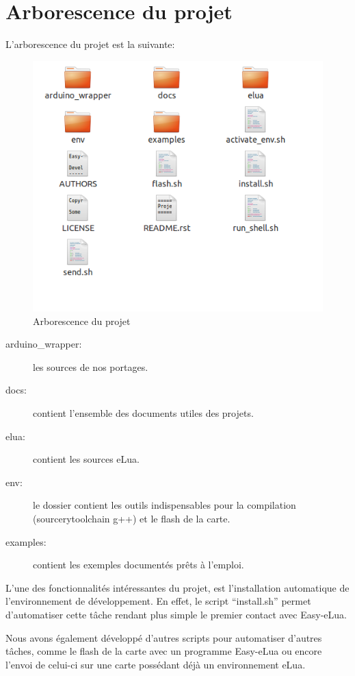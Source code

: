 \chapter[Arborescence du projet]{Arborescence du projet}
\label{chap:chap7}

L'arborescence du projet est la suivante:

\begin{figure}[h]
\begin{center}
\includegraphics[scale=0.6]{figure/arborescence.png}
\caption{Arborescence du projet}
\end{center}
\end{figure}

\begin{description}
 \item[arduino\_wrapper: ] les sources de nos portages.
 \item[docs: ] contient l’ensemble des documents utiles des projets.
 \item[elua: ] contient les sources eLua.
 \item[env: ] le dossier contient les outils indispensables pour la compilation (sourcerytoolchain g++) et le flash de la carte.
 \item[examples: ] contient les exemples documentés prêts à l’emploi.
\end{description}
 
L’une des fonctionnalités intéressantes du projet, est l’installation automatique de l’environnement de développement. 
En effet, le script ``install.sh'' permet d’automatiser cette tâche rendant plus simple le premier contact avec Easy-eLua.

Nous avons également développé d’autres scripts pour automatiser d’autres tâches, comme le flash de la carte avec un programme 
Easy-eLua ou encore l’envoi de celui-ci sur une carte possédant déjà un environnement eLua.

